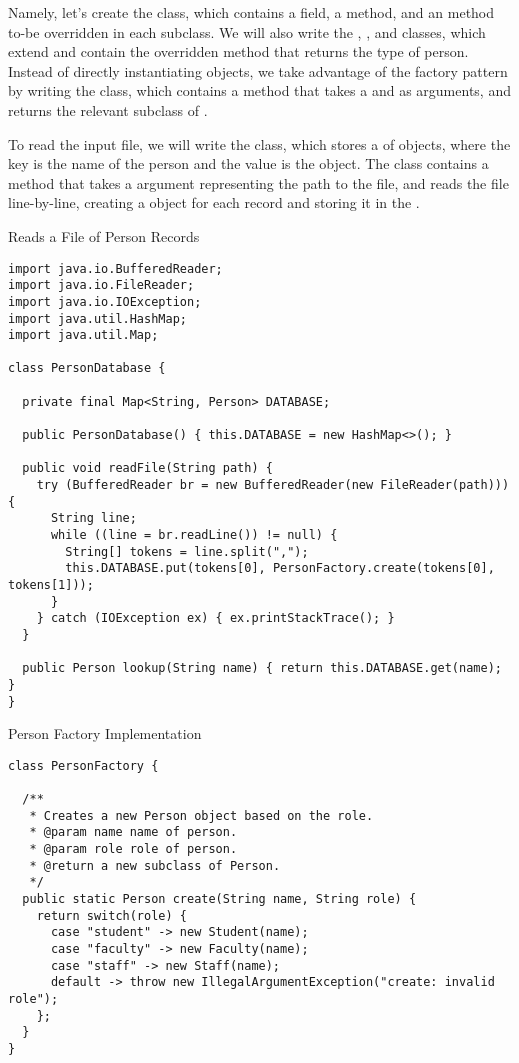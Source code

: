 Namely, let's create the   class, which contains a  field, a  method, and an   method to-be overridden in each subclass. We will also write the , , and  classes, which extend  and contain the overridden  method that returns the type of person. Instead of directly instantiating  objects, we take advantage of the factory pattern by writing the  class, which contains a  method that takes a  and  as arguments, and returns the relevant subclass of .

To read the input file, we will write the  class, which stores a  of  objects, where the key is the name of the person and the value is the  object. The  class contains a  method that takes a  argument representing the path to the file, and reads the file line-by-line, creating a  object for each record and storing it in the .

\begin{cl}{Reads a File of Person Records}
\begin{lstlisting}[language=MyJava]
import java.io.BufferedReader;
import java.io.FileReader;
import java.io.IOException;
import java.util.HashMap;
import java.util.Map;

class PersonDatabase {

  private final Map<String, Person> DATABASE;

  public PersonDatabase() { this.DATABASE = new HashMap<>(); }

  public void readFile(String path) {
    try (BufferedReader br = new BufferedReader(new FileReader(path))) {
      String line;
      while ((line = br.readLine()) != null) {
        String[] tokens = line.split(",");
        this.DATABASE.put(tokens[0], PersonFactory.create(tokens[0], tokens[1]));
      }
    } catch (IOException ex) { ex.printStackTrace(); }
  }

  public Person lookup(String name) { return this.DATABASE.get(name); }
}
\end{lstlisting}
\end{cl}

\begin{cl}{Person Factory Implementation}
\begin{lstlisting}[language=MyJava]
class PersonFactory {
  
  /**
   * Creates a new Person object based on the role.
   * @param name name of person.
   * @param role role of person.
   * @return a new subclass of Person.
   */
  public static Person create(String name, String role) {
    return switch(role) {
      case "student" -> new Student(name);
      case "faculty" -> new Faculty(name);
      case "staff" -> new Staff(name);
      default -> throw new IllegalArgumentException("create: invalid role");
    };
  }
}
\end{lstlisting}
\end{cl}

